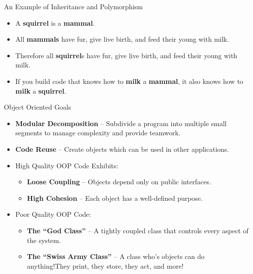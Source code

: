 \documentclass[handout]{beamer}
\begin{document}
\begin{frame}{An Example of Inheritance and Polymorphism}
    \begin{itemize}[<+->]
        \item A {\bf squirrel} is a {\bf mammal}.
        \item All {\bf mammals} have fur, give live birth, and feed their young with milk.
        \item Therefore all {\bf squirrel}s have fur, give live birth, and feed their young with milk.
        \item If you build code that knows how to {\bf milk} a {\bf mammal}, it also knows how to {\bf milk} a {\bf squirrel}.
    \end{itemize}
\end{frame}


\begin{frame}{Object Oriented Goals}
    \begin{itemize}[<+->]
        \item {\bf Modular Decomposition} -- Subdivide a program into multiple small segments to manage complexity and provide teamwork.
        \item {\bf Code Reuse} -- Create objects which can be used in other applications.
        \item High Quality OOP Code Exhibits:
            \begin{itemize}
                \item {\bf Loose Coupling} -- Objects depend only on public interfaces.
                \item {\bf High Cohesion} -- Each object has a well-defined purpose.
            \end{itemize}
        \item Poor Quality OOP Code:
            \begin{itemize}
                \item {\bf The ``God Class''} -- A tightly coupled class that controls every aspect of the system.
                \item {\bf The ``Swiss Army Class''} -- A class who's objects can do anything!They print, they store, they act, and more!
            \end{itemize}
    \end{itemize}
\end{frame}
\end{document}

